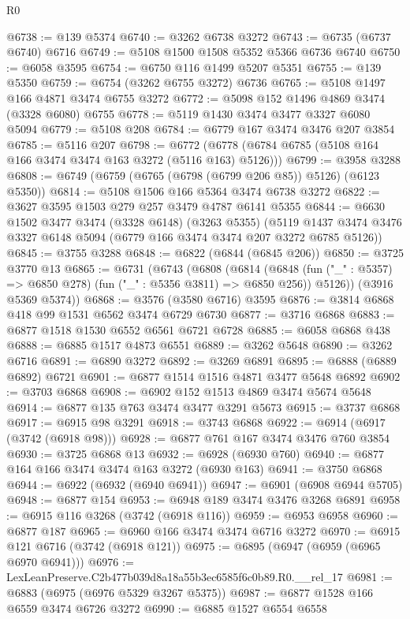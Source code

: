 \begin{lexlean}{R0}
\begin{coremodule}
@6738 := @139 @5374
@6740 := @3262 @6738 @3272
@6743 := @6735 (@6737 @6740) @6716
@6749 := @5108 @1500 @1508 @5352 @5366 @6736 @6740
@6750 := @6058 @3595
@6754 := @6750 @116 @1499 @5207 @5351
@6755 := @139 @5350
@6759 := @6754 (@3262 @6755 @3272) @6736
@6765 := @5108 @1497 @166 @4871 @3474 @6755 @3272
@6772 := @5098 @152 @1496 @4869 @3474 (@3328 @6080) @6755
@6778 := @5119 @1430 @3474 @3477 @3327 @6080 @5094
@6779 := @5108 @208
@6784 := @6779 @167 @3474 @3476 @207 @3854
@6785 := @5116 @207
@6798 := @6772 (@6778 (@6784 @6785 (@5108 @164 @166 @3474 @3474 @163 @3272 (@5116 @163) @5126)))
@6799 := @3958 @3288
@6808 := @6749 (@6759 (@6765 (@6798 (@6799 @206 @85)) @5126) (@6123 @5350))
@6814 := @5108 @1506 @166 @5364 @3474 @6738 @3272
@6822 := @3627 @3595 @1503 @279 @257 @3479 @4787 @6141 @5355
@6844 := @6630
    @1502
    @3477
    @3474
    (@3328 @6148)
    (@3263 @5355)
    (@5119 @1437 @3474 @3476 @3327 @6148 @5094 (@6779 @166 @3474 @3474 @207 @3272 @6785 @5126))
@6845 := @3755 @3288
@6848 := @6822 (@6844 (@6845 @206))
@6850 := @3725 @3770 @13
@6865 := @6731
    (@6743
      (@6808
        (@6814
          (@6848 (fun ("_" : @5357) => @6850 @278) (fun ("_" : @5356 @3811) => @6850 @256))
          @5126))
      (@3916 @5369 @5374))
@6868 := @3576 (@3580 @6716) @3595
@6876 := @3814 @6868 @418 @99 @1531 @6562 @3474 @6729 @6730
@6877 := @3716 @6868
@6883 := @6877 @1518 @1530 @6552 @6561 @6721 @6728
@6885 := @6058 @6868 @438
@6888 := @6885 @1517 @4873 @6551
@6889 := @3262 @5648
@6890 := @3262 @6716
@6891 := @6890 @3272
@6892 := @3269 @6891
@6895 := @6888 (@6889 @6892) @6721
@6901 := @6877 @1514 @1516 @4871 @3477 @5648 @6892
@6902 := @3703 @6868
@6908 := @6902 @152 @1513 @4869 @3474 @5674 @5648
@6914 := @6877 @135 @763 @3474 @3477 @3291 @5673
@6915 := @3737 @6868
@6917 := @6915 @98 @3291
@6918 := @3743 @6868
@6922 := @6914 (@6917 (@3742 (@6918 @98)))
@6928 := @6877 @761 @167 @3474 @3476 @760 @3854
@6930 := @3725 @6868 @13
@6932 := @6928 (@6930 @760)
@6940 := @6877 @164 @166 @3474 @3474 @163 @3272 (@6930 @163)
@6941 := @3750 @6868
@6944 := @6922 (@6932 (@6940 @6941))
@6947 := @6901 (@6908 @6944 @5705)
@6948 := @6877 @154
@6953 := @6948 @189 @3474 @3476 @3268 @6891
@6958 := @6915 @116 @3268 (@3742 (@6918 @116))
@6959 := @6953 @6958
@6960 := @6877 @187
@6965 := @6960 @166 @3474 @3474 @6716 @3272
@6970 := @6915 @121 @6716 (@3742 (@6918 @121))
@6975 := @6895 (@6947 (@6959 (@6965 @6970 @6941)))
@6976 := LexLeanPreserve.C2b477b039d8a18a55b3ec6585f6c0b89.R0.__rel_17
@6981 := @6883 (@6975 (@6976 @5329 @3267 @5375))
@6987 := @6877 @1528 @166 @6559 @3474 @6726 @3272
@6990 := @6885 @1527 @6554 @6558

\end{coremodule}
\end{lexlean}
